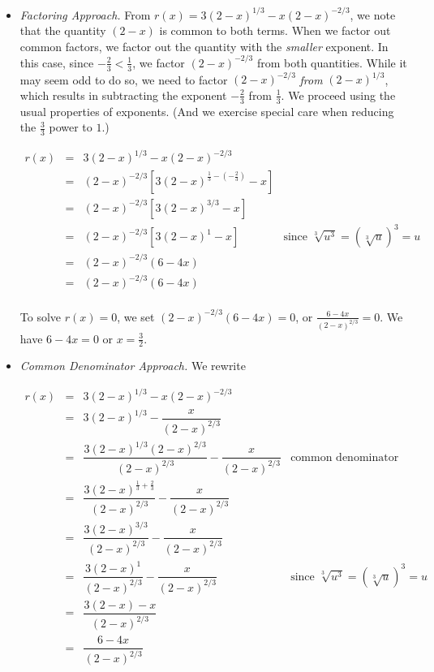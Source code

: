 {\begin{enumerate}
\begin{itemize}

\item  \textit{Factoring Approach.}  From $r(x) = 3 (2-x)^{1/3} - x (2-x)^{-2/3}$, we note that the quantity $(2-x)$ is common to both terms.  When we factor out common factors, we factor out the quantity with the \textit{smaller} exponent.  In this case, since $-\frac{2}{3} < \frac{1}{3}$, we factor $(2-x)^{-2/3}$ from both quantities.  While it may seem odd to do so, we need to factor $(2-x)^{-2/3}$ \textit{from} $(2-x)^{1/3}$, which results in subtracting the exponent $-\frac{2}{3}$ from $\frac{1}{3}$.  We proceed using the usual properties of exponents. (And we exercise special care when reducing the $\frac{3}{3}$ power to $1$.)

\[ \begin{array}{rclr}

r(x)  & = & 3 (2-x)^{1/3} - x (2-x)^{-2/3} & \\ [3pt]
      & = & (2-x)^{-2/3} \left[ 3 (2-x)^{\frac{1}{3} - \left(-\frac{2}{3}\right)} - x\right] & \\ [6pt]
      & = & (2-x)^{-2/3}\left[3(2-x)^{3/3} - x\right] & \\ [3pt]
      & = & (2-x)^{-2/3}\left[3(2-x)^{1} - x\right] & \mbox{since $\sqrt[3]{u^3} = \left(\sqrt[3]{u}\right)^{3} = u$} \\ [3pt]
      & = & (2-x)^{-2/3}\left(6-4x\right) & \\ [3pt]
      & = & (2-x)^{-2/3}\left(6-4x\right) & \\
      
\end{array}\]

To solve $r(x) = 0$, we set $(2-x)^{-2/3}\left(6-4x\right) = 0$, or $\frac{6-4x}{(2-x)^{2/3}} = 0$.  We have $6-4x = 0$ or $x = \frac{3}{2}$.



\item \textit{Common Denominator Approach.}  We rewrite 

\[ \begin{array}{rclr}

r(x)  & = & 3 (2-x)^{1/3} - x (2-x)^{-2/3} & \\ [3pt]
      & = & 3 (2-x)^{1/3} - \dfrac{x}{(2-x)^{2/3}} & \\ [10pt]
      & = & \dfrac{3 (2-x)^{1/3}(2-x)^{2/3}}{(2-x)^{2/3}} - \dfrac{x}{(2-x)^{2/3}} & \mbox{common denominator} \\ [10pt]
      & = & \dfrac{3 (2-x)^{\frac{1}{3} + \frac{2}{3}}}{(2-x)^{2/3}} - \dfrac{x}{(2-x)^{2/3}} &  \\ [10pt]
      & = & \dfrac{3 (2-x)^{3/3}}{(2-x)^{2/3}} - \dfrac{x}{(2-x)^{2/3}} & \\ [10pt]
      & = & \dfrac{3 (2-x)^1}{(2-x)^{2/3}} - \dfrac{x}{(2-x)^{2/3}} & \mbox{since $\sqrt[3]{u^3} = \left(\sqrt[3]{u}\right)^{3} = u$} \\ [10pt]
      & = & \dfrac{3 (2-x) - x}{(2-x)^{2/3}} & \\ [10pt]
      & = & \dfrac{6-4x}{(2-x)^{2/3}} & \\


\end{array}\]
\end{itemize}
\end{enumerate}}
